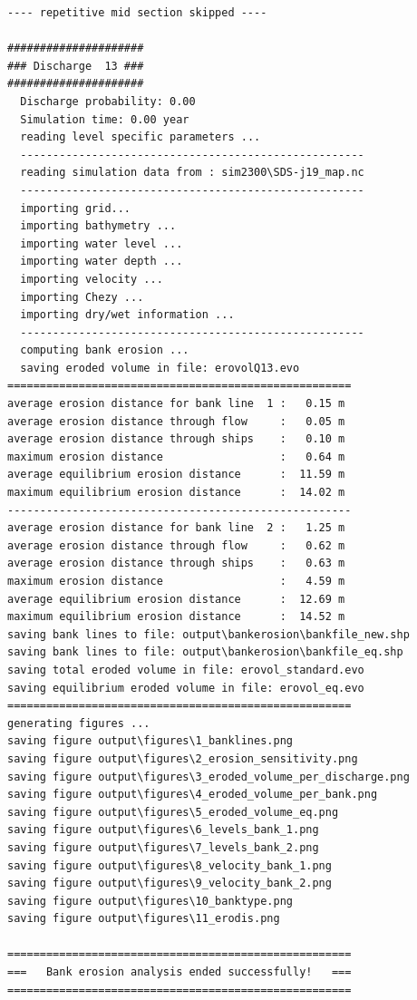 \begin{Verbatim}
---- repetitive mid section skipped ----

#####################
### Discharge  13 ###
#####################
  Discharge probability: 0.00
  Simulation time: 0.00 year
  reading level specific parameters ...
  -----------------------------------------------------
  reading simulation data from : sim2300\SDS-j19_map.nc
  -----------------------------------------------------
  importing grid...
  importing bathymetry ...
  importing water level ...
  importing water depth ...
  importing velocity ...
  importing Chezy ...
  importing dry/wet information ...
  -----------------------------------------------------
  computing bank erosion ...
  saving eroded volume in file: erovolQ13.evo
=====================================================
average erosion distance for bank line  1 :   0.15 m
average erosion distance through flow     :   0.05 m
average erosion distance through ships    :   0.10 m
maximum erosion distance                  :   0.64 m
average equilibrium erosion distance      :  11.59 m
maximum equilibrium erosion distance      :  14.02 m
-----------------------------------------------------
average erosion distance for bank line  2 :   1.25 m
average erosion distance through flow     :   0.62 m
average erosion distance through ships    :   0.63 m
maximum erosion distance                  :   4.59 m
average equilibrium erosion distance      :  12.69 m
maximum equilibrium erosion distance      :  14.52 m
saving bank lines to file: output\bankerosion\bankfile_new.shp
saving bank lines to file: output\bankerosion\bankfile_eq.shp
saving total eroded volume in file: erovol_standard.evo
saving equilibrium eroded volume in file: erovol_eq.evo
=====================================================
generating figures ...
saving figure output\figures\1_banklines.png
saving figure output\figures\2_erosion_sensitivity.png
saving figure output\figures\3_eroded_volume_per_discharge.png
saving figure output\figures\4_eroded_volume_per_bank.png
saving figure output\figures\5_eroded_volume_eq.png
saving figure output\figures\6_levels_bank_1.png
saving figure output\figures\7_levels_bank_2.png
saving figure output\figures\8_velocity_bank_1.png
saving figure output\figures\9_velocity_bank_2.png
saving figure output\figures\10_banktype.png
saving figure output\figures\11_erodis.png

=====================================================
===   Bank erosion analysis ended successfully!   ===
=====================================================
\end{Verbatim}

